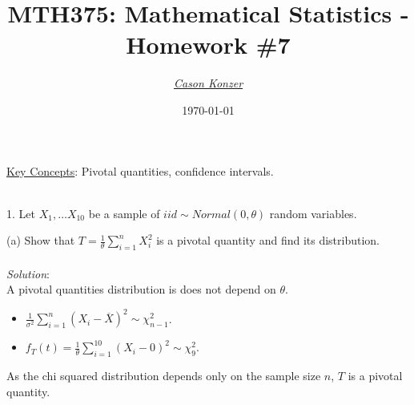 \documentclass[12pt]{article}
\newcommand{\XB}{\color{black}}
\newcommand{\XBB}{\color{blue}}
\newcommand{\XV}{\color{violet}}
\newcommand{\ds}{\displaystyle}
\begin{document}
\title{\textbf{MTH375}: Mathematical Statistics - Homework \#7}
\date{\today}
\author{\XV\textit{\large{\href{https://github.com/casonk}{Cason Konzer}}}\XB}

\maketitle
\hrulefill
\vfill 
    \underline{Key Concepts}: Pivotal quantities, confidence intervals.

\newpage
\newpage
\XBB\hrulefill\XB \\

1. Let $ X_{1}, \dots X_{10} $ be a sample of $ iid \sim Normal(0,\theta) $ random variables. \\ 

\XBB\hrulefill\XB 
\vspace{5mm}

(a) Show that $ \ds T = \frac{1}{\theta} \sum_{i=1}^{n} X_{i}^{2} $ is a pivotal quantity and find its distribution. \\
\vspace{2.5mm} \\
\textit{Solution}:
\vspace{2.5mm} \\

\noindent
A pivotal quantities distribution is does not depend on $ \theta $. \\

\begin{itemize}
    \item $ \ds \frac{1}{\sigma^{2}} \sum_{i=1}^{n} (X_{i} - \overline{X})^{2} \sim \chi_{n-1}^{2}  $. \\
    \item $ \ds f_{T}(t) = \frac{1}{\theta} \sum_{i=1}^{10} (X_{i} - 0)^{2} \sim \chi_{9}^{2}  $. \\
\end{itemize}

\noindent
As the chi squared distribution depends only on the sample size $ n $, $ T $ is a pivotal quantity. \\

\vspace{2.5mm}
\end{document}
